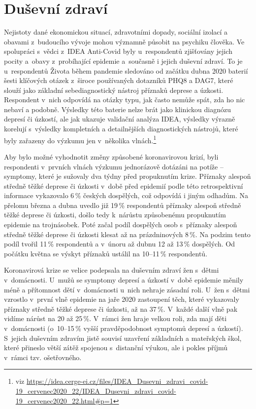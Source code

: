 \section*{Duševní zdraví}
\label{Dusevni_zdravi}

Nejistoty dané ekonomickou situací, zdravotními dopady, sociální izolací a obavami z budoucího vývoje mohou významně působit na psychiku člověka. Ve spolupráci s vědci z~IDEA Anti-Covid byly u~respondentů zjišťovány jejich pocity a obavy z probíhající epidemie a současně i jejich duševní zdraví. To je u~respondentů Života během pandemie sledováno od začátku dubna 2020 baterií šesti klíčových otázek z široce používaných dotazníků PHQ8 a DAG7, které slouží jako základní sebediagnostický nástroj příznaků deprese a úzkosti. Respondent v nich odpovídá na otázky typu, jak často nemůže spát, zda ho nic nebaví a podobně. Výsledky této baterie nelze brát jako klinickou diagnózu depresí či úzkostí, ale jak ukazuje validační analýza IDEA, výsledky výrazně korelují s výsledky kompletních a detailnějších diagnostických nástrojů, které byly zařazeny do výzkumu jen v několika vlnách.\footnote{viz
\url{https://idea.cerge-ei.cz/files/IDEA\_Dusevni\_zdravi\_covid-19\_cervenec2020\_22/IDEA\_Dusevni\_zdravi\_covid-19\_cervenec2020\_22.html\#p=1}}

Aby bylo možné vyhodnotit změny způsobené koronavirovou krizí, byli respondenti v prvních vlnách výzkumu jednorázově dotázáni na potíže – symptomy, které je sužovaly dva týdny před propuknutím krize. Příznaky alespoň středně těžké deprese či úzkosti v~době před epidemií podle této retrospektivní informace vykazovalo 6\,\% českých dospělých, což odpovídá i jiným odhadům. Na přelomu března a dubna uvedlo již 19\,\% respondentů příznaky alespoň středně těžké deprese či úzkosti, došlo tedy k~nárůstu způsobenému propuknutím epidemie na trojnásobek. Poté začal podíl dospělých osob s příznaky alespoň středně těžké deprese či úzkosti klesat až na prázdninových 8\,\%. Na podzim tento podíl tvořil 11\,\% respondentů a v únoru až dubnu 12 až 13\,\% dospělých. Od počátku května se výskyt příznaků ustálil na 10–11\,\% respondentů.

Koronavirová krize se velice podepsala na duševním zdraví žen s dětmi v~domácnosti. U~mužů se symptomy depresí a úzkostí v době epidemie měnily méně a přítomnost dětí v domácnosti u~nich nehraje zásadní roli. U~žen s dětmi vzrostlo v první vlně epidemie na jaře 2020 zastoupení těch, které vykazovaly příznaky středně těžké deprese či úzkosti, až na 37\,\%. V každé další vlně pak vidíme nárůst na 20 až 25\,\%. V rámci žen hraje velkou roli, zda mají děti v domácnosti (o~10--15\,\% vyšší pravděpodobnost symptomů depresí a úzkostí). S jejich duševním zdravím jistě souvisí uzavření základních a mateřských škol, které přineslo větší zátěž spojenou s distanční výukou, ale i pokles příjmů v rámci tzv. ošetřovného.

